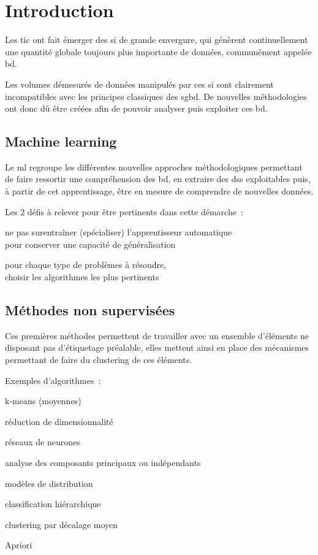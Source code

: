 \section{Introduction}

Les \gls{tic} ont fait émerger des \gls{si} de grande envergure, qui génèrent
continuellement une quantité globale toujours plus importante de données,
communément appelée \gls{bd}.

Les volumes démesurés de données manipulés par ces \gls{si} sont clairement
incompatibles avec les principes classiques des \gls{sgbd}.
De nouvelles méthodologies ont donc dû être créées afin de pouvoir
analyser puis exploiter ces \gls{bd}.

\subsection{Machine learning}

Le \gls{ml} regroupe les différentes nouvelles approches méthodologiques
permettant de faire ressortir une compréhension des \gls{bd}, en extraire
des \glspl{ds} exploitables puis, à partir de cet apprentissage,
être en mesure de comprendre de nouvelles données.

Les 2 défis à relever pour être pertinents dans cette démarche :
\begin{itmz}
\item{ne pas surentraîner (spécialiser) l’apprentisseur automatique\\
pour conserver une capacité de généralisation}
\item{pour chaque type de problèmes à résoudre,\\
choisir les algorithmes les plus pertinents}
\end{itmz}

\subsection{Méthodes non supervisées}

Ces premières méthodes permettent de travailler avec un ensemble d’éléments
ne disposant pas d’étiquetage préalable, elles mettent ainsi en place
des mécanismes permettant de faire du \gls{clustering} de ces éléments.

Exemples d’algorithmes :
\begin{itmz}
\item{k-means (moyennes)}
\item{réduction de dimensionnalité}
\item{réseaux de neurones}
\item{analyse des composants principaux ou indépendants}
\item{modèles de distribution}
\item{classification hiérarchique}
\item{\gls{clustering} par décalage moyen}
\item{Apriori}
\end{itmz}

